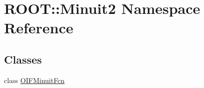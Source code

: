 \hypertarget{namespaceROOT_1_1Minuit2}{
\section{ROOT::Minuit2 Namespace Reference}
\label{d6/d3a/namespaceROOT_1_1Minuit2}
}
\subsection*{Classes}
\begin{DoxyCompactItemize}
\item 
class \hyperlink{classROOT_1_1Minuit2_1_1OIFMinuitFcn}{OIFMinuitFcn}
\end{DoxyCompactItemize}
